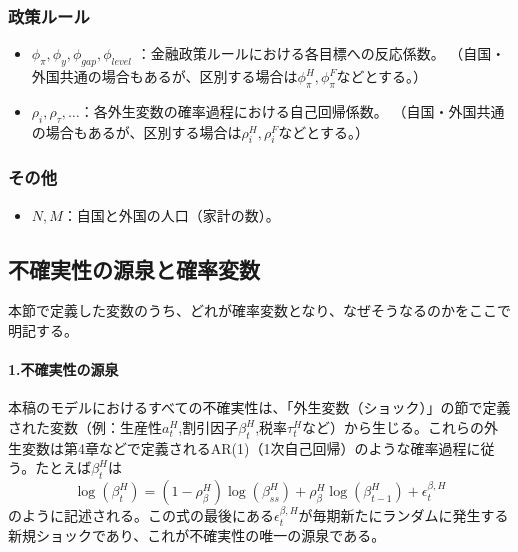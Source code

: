 \subsubsection*{政策ルール}
\label{sec:model_variables_parameters_policy}
\begin{itemize}
    \item
    \label{itm:model_variables_parameters_policy_phi}
        \(\phi_\pi,\phi_y,\phi_{gap},\phi_{level}\)
        ：金融政策ルールにおける各目標への反応係数。
        （自国・外国共通の場合もあるが、区別する場合は\(\phi_\pi^H,\phi_\pi^F\)などとする。）
    \item
    \label{itm:model_variables_parameters_policy_rho}
        \(\rho_i,\rho_\tau,\dots\)：各外生変数の確率過程における自己回帰係数。
        （自国・外国共通の場合もあるが、区別する場合は\(\rho_i^H,\rho_i^F\)などとする。）
\end{itemize}

\subsubsection*{その他}
\label{sec:model_variables_parameters_others}
\begin{itemize}
    \item
    \label{itm:model_variables_parameters_others_pop}
        \(N,M\)：自国と外国の人口（家計の数）。
\end{itemize}

\subsection*{不確実性の源泉と確率変数}
\label{sec:model_variables_stochastic_nature}
本節で定義した変数のうち、どれが確率変数となり、なぜそうなるのかをここで明記する。

\paragraph{1.不確実性の源泉}
\label{sec:model_variables_stochastic_nature_sources}
本稿のモデルにおけるすべての不確実性は、「外生変数（ショック）」の節で定義された変数（例：生産性\(a_t^H\),割引因子\(\beta_t^H\),税率\(\tau_t^H\)など）から生じる。これらの外生変数は第4章などで定義されるAR(1)（1次自己回帰）のような確率過程に従う。たとえば\(\beta_t^H\)は
\begin{equation}
\label{form:model_variables_stochastic_nature_sources_beta_def}
    \log(\beta_t^H)=(1-\rho_\beta^H)\log(\beta_{ss}^H)+\rho_\beta^H\log(\beta_{t-1}^H)+\epsilon_t^{\beta,H}
\end{equation}
のように記述される。この式の最後にある\(\epsilon_t^{\beta,H}\)が毎期新たにランダムに発生する新規ショックであり、これが不確実性の唯一の源泉である。

